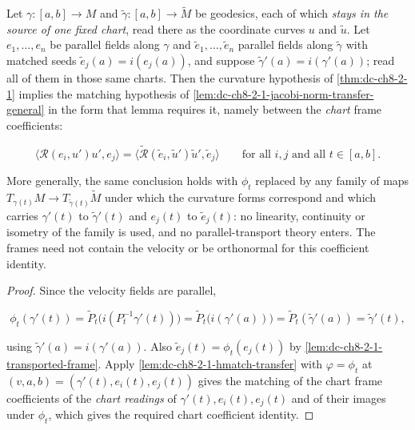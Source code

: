 \begin{lemma}
  \label{lem:dc-ch8-2-1-frame-chart-interface}
  \leanok
  Let $\gamma:[a,b]\to M$ and $\tilde\gamma:[a,b]\to\tilde M$ be geodesics, each of which
  \emph{stays in the source of one fixed chart}, read there as the coordinate curves $u$ and
  $\tilde u$. Let $e_1,\dots,e_n$ be parallel fields along $\gamma$ and $\tilde e_1,\dots,
  \tilde e_n$ parallel fields along $\tilde\gamma$ with matched seeds
  $\tilde e_j(a)=i(e_j(a))$, and suppose $\tilde\gamma'(a)=i(\gamma'(a))$; read all of them
  in those same charts. Then the curvature hypothesis of \cref{thm:dc-ch8-2-1} implies the
  matching hypothesis of \cref{lem:dc-ch8-2-1-jacobi-norm-transfer-general} in the form that
  lemma requires it, namely between the \emph{chart} frame coefficients:

  $$
  \langle\mathcal R(e_i,u')u',e_j\rangle
  =\big\langle\tilde{\mathcal R}(\tilde e_i,\tilde u')\tilde u',\tilde e_j\big\rangle
  \qquad\text{for all }i,j\text{ and all }t\in[a,b] .
  $$

  More generally, the same conclusion holds with $\phi_t$ replaced by any family of
  maps $T_{\gamma(t)}M\to T_{\tilde\gamma(t)}\tilde M$ under which the curvature forms
  correspond and which carries $\gamma'(t)$ to $\tilde\gamma'(t)$ and $e_j(t)$ to
  $\tilde e_j(t)$: no linearity, continuity or isometry of the family is used, and no
  parallel-transport theory enters. The frames need not contain the velocity or be
  orthonormal for this coefficient identity.
\end{lemma}
\begin{proof}
  \leanok
\sketch
  Since the velocity fields are parallel,

  $$
  \phi_t(\gamma'(t))=\tilde P_t\big(i(P_t^{-1}\gamma'(t))\big)=\tilde P_t\big(i(\gamma'(a))\big)
  =\tilde P_t(\tilde\gamma'(a))=\tilde\gamma'(t) ,
  $$

  using $\tilde\gamma'(a)=i(\gamma'(a))$. Also
  $\tilde e_j(t)=\phi_t(e_j(t))$ by \cref{lem:dc-ch8-2-1-transported-frame}.
  Apply \cref{lem:dc-ch8-2-1-hmatch-transfer} with $\varphi=\phi_t$ at
  $(v,a,b)=(\gamma'(t),e_i(t),e_j(t))$ gives the matching of the chart frame coefficients of
  the \emph{chart readings} of $\gamma'(t),e_i(t),e_j(t)$ and of their images under $\phi_t$,
  which gives the required chart coefficient identity.
\end{proof}


